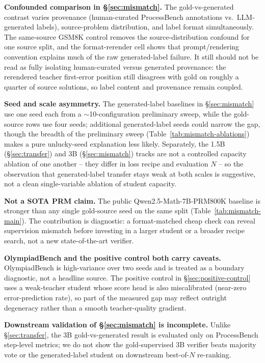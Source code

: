 \documentclass[11pt]{article}
\begin{document}
\textbf{Confounded comparison in \S\ref{sec:mismatch}.} The gold-vs-generated
contrast varies provenance (human-curated ProcessBench annotations vs.\
LLM-generated labels), source-problem distribution, and label format
simultaneously. The same-source GSM8K control removes the source-distribution
confound for one source split, and the format-rerender cell shows that
prompt/rendering convention explains much of the raw generated-label failure.
It still should not be read as fully isolating human-curated versus generated
provenance: the rerendered teacher first-error position still disagrees with
gold on roughly a quarter of source solutions, so label content and provenance
remain coupled.

\textbf{Seed and scale asymmetry.} The generated-label baselines in
\S\ref{sec:mismatch} use one seed each from a $\sim$10-configuration
preliminary sweep, while the gold-source rows use four seeds; additional
generated-label seeds could narrow the gap, though the breadth of the
preliminary sweep (Table~\ref{tab:mismatch-ablations}) makes a pure
unlucky-seed explanation less likely. Separately, the 1.5B (\S\ref{sec:transfer})
and 3B (\S\ref{sec:mismatch}) tracks are not a controlled capacity ablation
of one another -- they differ in loss recipe and evaluation $N$ -- so the
observation that generated-label transfer stays weak at both scales is
suggestive, not a clean single-variable ablation of student capacity.

\textbf{Not a SOTA PRM claim.} The public Qwen2.5-Math-7B-PRM800K baseline
is stronger than any single gold-source seed on the same split
(Table~\ref{tab:mismatch-main}). The contribution is diagnostic: a
format-matched cheap check can reveal supervision mismatch before investing
in a larger student or a broader recipe search, not a new state-of-the-art
verifier.

\textbf{OlympiadBench and the positive control both carry caveats.}
OlympiadBench is high-variance over two seeds and is treated as a boundary
diagnostic, not a headline source. The positive control in
\S\ref{sec:positive-control} uses a weak-teacher student whose score head is
also miscalibrated (near-zero error-prediction rate), so part of the
measured gap may reflect outright degeneracy rather than a smooth
teacher-quality gradient.

\textbf{Downstream validation of \S\ref{sec:mismatch} is incomplete.} Unlike
\S\ref{sec:transfer}, the 3B gold-vs-generated result is evaluated only on
ProcessBench step-level metrics; we do not show the gold-supervised 3B
verifier beats majority vote or the generated-label student on downstream
best-of-$N$ re-ranking.
\end{document}
